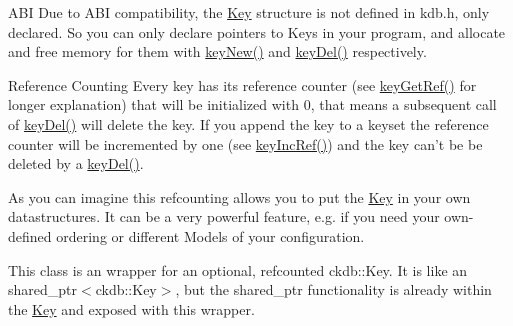 \begin{DoxyParagraph}{A\+B\+I}
Due to A\+B\+I compatibility, the {\ttfamily \hyperlink{classkdb_1_1Key}{Key}} structure is not defined in kdb.\+h, only declared. So you can only declare {\ttfamily pointers} to {\ttfamily Keys} in your program, and allocate and free memory for them with \hyperlink{group__key_gad23c65b44bf48d773759e1f9a4d43b89}{key\+New()} and \hyperlink{group__key_ga3df95bbc2494e3e6703ece5639be5bb1}{key\+Del()} respectively.
\end{DoxyParagraph}
\begin{DoxyParagraph}{Reference Counting}
Every key has its reference counter (see \hyperlink{group__key_ga4aabc4272506dd63161db2bbb42de8ae}{key\+Get\+Ref()} for longer explanation) that will be initialized with 0, that means a subsequent call of \hyperlink{group__key_ga3df95bbc2494e3e6703ece5639be5bb1}{key\+Del()} will delete the key. If you append the key to a keyset the reference counter will be incremented by one (see \hyperlink{group__key_ga6970a6f254d67af7e39f8e469bb162f1}{key\+Inc\+Ref()}) and the key can't be be deleted by a \hyperlink{group__key_ga3df95bbc2494e3e6703ece5639be5bb1}{key\+Del()}.
\end{DoxyParagraph}
\begin{DoxyParagraph}{}
As you can imagine this refcounting allows you to put the \hyperlink{classkdb_1_1Key}{Key} in your own datastructures. It can be a very powerful feature, e.\+g. if you need your own-\/defined ordering or different Models of your configuration.
\end{DoxyParagraph}
This class is an wrapper for an optional, refcounted ckdb\+::\+Key. It is like an shared\+\_\+ptr$<$ckdb\+::\+Key$>$, but the shared\+\_\+ptr functionality is already within the \hyperlink{classkdb_1_1Key}{Key} and exposed with this wrapper.

